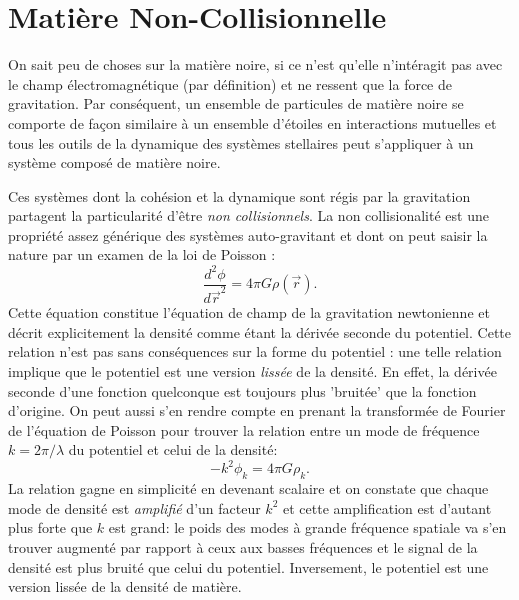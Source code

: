 \section{Matière Non-Collisionnelle}
On sait peu de choses sur la matière noire, si ce n'est qu'elle n'intéragit pas avec le champ électromagnétique (par définition) et ne ressent que la force de gravitation. Par conséquent, un ensemble de particules de matière noire se comporte de façon similaire à un ensemble d'étoiles en interactions mutuelles et tous les outils de la dynamique des systèmes stellaires peut s'appliquer à un système composé de matière noire.

Ces systèmes dont la cohésion et la dynamique sont régis par la gravitation partagent la particularité d'être \textit{non collisionnels}. La non collisionalité est une propriété assez générique des systèmes auto-gravitant  et dont on peut saisir la nature par un examen de la loi de Poisson  :
\begin{equation}
\frac{d^2\phi}{d\vec{r}^2}=4\pi G\rho(\vec{r}).
\end{equation} 
Cette équation constitue l'équation de champ de la gravitation newtonienne et décrit explicitement la densité comme étant la dérivée seconde du potentiel. Cette relation n'est pas sans conséquences sur la forme du potentiel : une telle relation implique que le potentiel est une version \textit{lissée} de la densité. En effet, la dérivée seconde d'une fonction quelconque est toujours plus 'bruitée' que la fonction d'origine. On peut aussi s'en rendre compte en prenant la transformée de Fourier de l'équation de Poisson pour trouver la relation entre un mode de fréquence $k=2\pi/\lambda$ du potentiel et celui de la densité:
\begin{equation}
-k^2 \phi_k=4\pi G \rho_k.
\end{equation}
La relation gagne en simplicité en devenant scalaire et on constate que chaque mode de densité est \textit{amplifié} d'un facteur $k^2$ et cette amplification est d'autant plus forte que $k$ est grand: le poids des modes à grande fréquence spatiale va s'en trouver augmenté par rapport à ceux aux basses fréquences et le signal de la densité est plus bruité que celui du potentiel. Inversement, le potentiel est une version lissée de la densité de matière.
